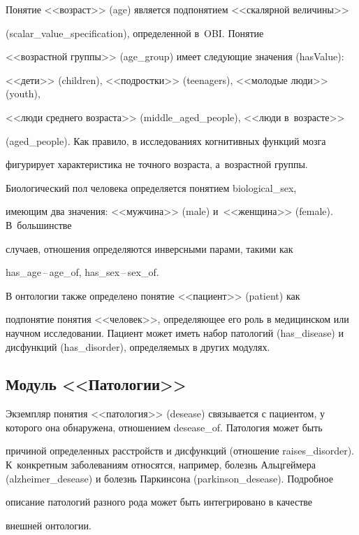       

      Понятие <<возраст>> (age) является подпонятием <<скалярной величины>> 

      (scalar\_value\_specification), определенной в~OBI. Понятие 

      <<возрастной группы>> (age\_group) имеет следующие значения (hasValue): 

      <<дети>> (children), <<подростки>> (teenagers), <<молодые люди>> (youth), 

      <<люди среднего возраста>> (middle\_aged\_people), <<люди в~возрасте>> 

      (aged\_people). Как правило, в исследованиях когнитивных функций мозга 

фигурирует характеристика не точного возраста, а~возрастной группы. 

Биологический пол человека определяется понятием biological\_sex, 

имеющим два значения: <<мужчина>> (male) и~<<женщина>> (female). В~большинстве 

случаев, отношения определяются инверсными парами, такими как 

has\_age\,--\,age\_of, has\_sex\,--\,sex\_of. 

      

      В онтологии также определено понятие <<пациент>> (patient) как 

подпонятие понятия <<человек>>, определяющее его роль в медицинском или научном исследовании. Пациент может иметь набор патологий (has\_disease) и дисфункций (has\_disorder), определяемых в других модулях.

      

\subsection{Модуль <<Патологии>>}



      Экземпляр понятия <<патология>> (desease) связывается с пациентом, у которого она обнаружена, отношением desease\_of. Патология может быть 

причиной определенных расстройств и дисфункций (отношение raises\_disorder). К~конкретным заболеваниям относятся, например, болезнь Альцгеймера (alzheimer\_desease) и болезнь Паркинсона (parkinson\_desease). Подробное

 описание патологий разного рода может быть интегрировано в качестве 

внешней онтологии.

